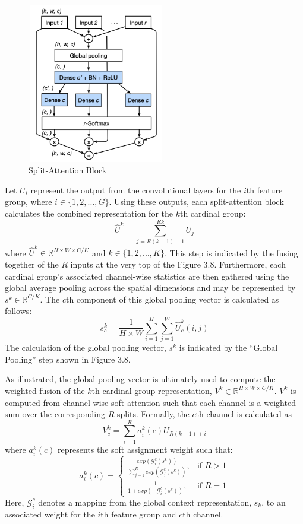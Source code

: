 \documentclass [MAS] {uclathes}
\begin{document}
\begin{figure}[h]
\centering
\includegraphics[height = 70mm, width= 60mm]{imgs/split_att.png}
\caption{Split-Attention Block}
\label{fig:split_att_block}
\end{figure}


Let $U_i$ represent the output from the convolutional layers for the $i$th feature group, where $i \in \{1, 2, ..., G \}$. Using these outputs, each split-attention block calculates the combined representation for the $k$th cardinal group: $$\hat{U}^k = \sum_{j = R(k-1)+1}^{Rk} U_j$$ where $\hat{U}^k \in \mathbb{R}^{H \times W \times C/K}$ and $k \in \{1, 2, ..., K\}$. This step is indicated by the fusing together of the $R$ inputs at the very top of the Figure 3.8. Furthermore, each cardinal group's associated channel-wise statistics are then gathered using the global average pooling across the spatial dimensions and may be represented by $s^k \in \mathbb{R}^{C/K}$. The $c$th component of this global pooling vector is calculated as follows: $$s_{c}^{k} = \frac{1}{H \times W} \sum_{i = 1}^{H} \sum_{j = 1}^{W} \hat{U}_{c}^{k}(i, j)$$ The calculation of the global pooling vector, $s^k$ is indicated by the ``Global Pooling'' step shown in Figure 3.8. 

As illustrated, the global pooling vector is ultimately used to compute the weighted fusion of the $k$th cardinal group 
representation, $V^k \in \mathbb{R}^{H \times W \times C/K}$. $V^k$ is computed from channel-wise soft attention such that each channel is a weighted sum over the corresponding $R$ splits. Formally, the $c$th channel is calculated as $$V_{c}^{k} = \sum_{i = 1}^{R} a_{i}^{k}(c) U_{R(k-1) + i}$$ where $a_{i}^{k}(c)$ represents the soft assignment weight such that: \[  a_{i}^{k}(c)= \begin{cases} \frac{exp(\mathcal{G}_{i}^c(s^k))}{\sum_{j=1}^{R} exp(\mathcal{G}_{j}^c(s^k))}, & \text{if } R > 1\\ \frac{1}{1 + exp(-\mathcal{G}_{i}^c(s^k))}, & \text{if } R = 1 \end{cases} \] Here, $\mathcal{G}_{i}^{c}$ denotes a mapping from the global context representation, $s_k$, to an associated weight for the $i$th feature group and $c$th channel. 
\end{document}
